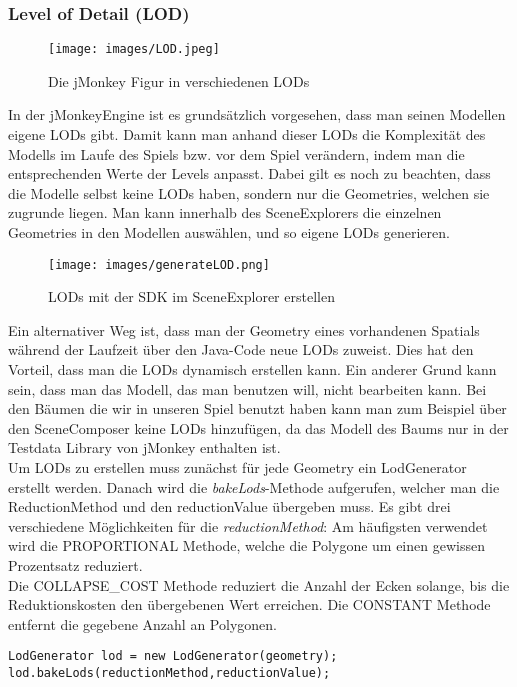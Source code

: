 \subsubsection{Level of Detail (LOD)}
\begin{figure}[h!]
	
	
	\caption{Die jMonkey Figur in verschiedenen LODs}
	
	\centering\texttt{[image: images/LOD.jpeg]}
	
\end{figure}  
In der jMonkeyEngine ist es grundsätzlich vorgesehen, dass man seinen Modellen eigene LODs gibt. Damit kann man anhand dieser LODs die Komplexität des Modells im Laufe des Spiels bzw. vor dem Spiel verändern, indem man die entsprechenden Werte der Levels anpasst. Dabei gilt es noch zu beachten, dass die Modelle selbst keine LODs haben, sondern nur die Geometries, welchen sie zugrunde liegen. Man kann innerhalb des SceneExplorers die einzelnen Geometries in den Modellen auswählen, und so eigene LODs generieren.\\
\begin{figure}[H]
	
	\caption{LODs mit der SDK im SceneExplorer erstellen}
	
	\centering\texttt{[image: images/generateLOD.png]}
	
\end{figure} 
Ein alternativer Weg ist, dass man der Geometry eines vorhandenen Spatials während der Laufzeit über den Java-Code neue LODs zuweist. Dies hat den Vorteil, dass man die LODs dynamisch erstellen kann. Ein anderer Grund kann sein, dass man das Modell, das man benutzen will, nicht bearbeiten kann. Bei den Bäumen die wir in unseren Spiel benutzt haben kann man zum Beispiel über den SceneComposer keine LODs hinzufügen, da das Modell des Baums nur in der Testdata Library von jMonkey enthalten ist. \\
Um LODs zu erstellen muss zunächst für jede Geometry ein LodGenerator erstellt werden. Danach wird die \emph{bakeLods}-Methode aufgerufen, welcher man die ReductionMethod und den reductionValue übergeben muss. Es gibt drei verschiedene Möglichkeiten für die \emph{reductionMethod}: Am häufigsten verwendet wird die PROPORTIONAL Methode, welche die Polygone um einen gewissen Prozentsatz reduziert. \\
Die COLLAPSE\_COST Methode reduziert die Anzahl der Ecken solange, bis die Reduktionskosten den übergebenen Wert erreichen. Die CONSTANT Methode entfernt die gegebene Anzahl an Polygonen.
\begin{lstlisting}
LodGenerator lod = new LodGenerator(geometry);
lod.bakeLods(reductionMethod,reductionValue);
\end{lstlisting}

